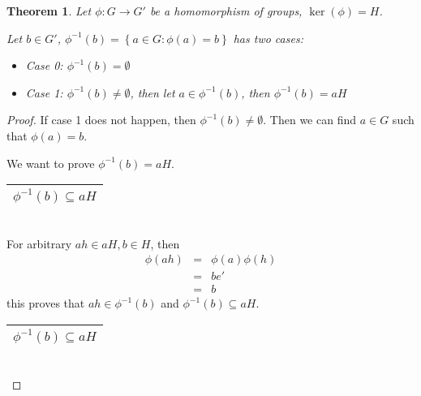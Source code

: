\documentclass{article}
\theoremstyle{MyNonumberplain}
\theoremstyle{break}
\newtheorem*{proof}{Proof. }
\newcommand{\p}{\phi}
\theoremstyle{break}
\newtheorem{theorem}{Theorem}[section]
\theoremstyle{break}
\theoremstyle{definition}
\theoremstyle{break}
\begin{document}
\begin{thmbox}
    \begin{theorem}
        Let $\p : G \rightarrow G'$ be a homomorphism of groups, $\ker \left( \p
        \right) = H$.\bigskip

        Let $b \in G'$, $\p^{- 1} (b) = \left\{ a \in G : \p (a) = b \right\}$ has
        two cases:\\
        \begin{itemize}
        \item Case 0: $\p^{- 1} (b) = \emptyset$\\
        
        \item Case 1: $\p^{- 1} (b) \neq \emptyset$, then let $a \in \p^{- 1}
        (b)$, then $\p^{- 1} (b) = a H$
        \end{itemize}
    \end{theorem}
            \begin{prfbox}
                \begin{proof}
                    If case 1 does not happen, then $\p^{- 1} (b) \neq \emptyset$. Then we can
                    find $a \in G$ such that $\p (a) = b$.\bigskip

                    We want to prove $\p^{- 1} (b) = a H$.\bigskip

                    \begin{tabular}{|c|}
                    \hline
                    $\p^{- 1} (b) \subseteq a H$\\
                    \hline
                    \end{tabular}\\

                    For arbitrary $a h \in a H, b \in H$, then
                    \begin{eqnarray*}
                    \p (a h) & = & \p (a) \p (h)\\
                    & = & b e'\\
                    & = & b
                    \end{eqnarray*}
                    this proves that $a h \in \p^{- 1} (b)$ and $\p^{- 1} (b) \subseteq a H$.\bigskip

                    \begin{tabular}{|c|}
                    \hline
                    $\p^{- 1} (b) \subseteq a H$\\
                    \hline
                    \end{tabular}\\


\end{proof}
\end{prfbox}
\end{thmbox}
\end{document}
